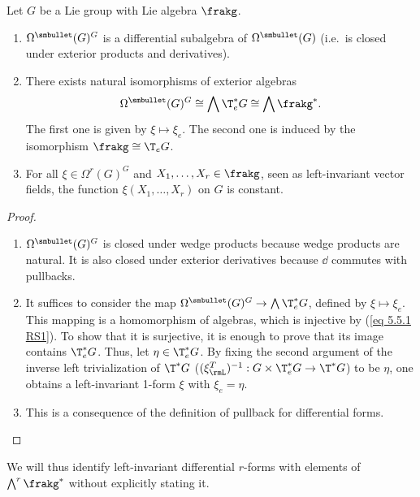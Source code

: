 \begin{prop}[{{\cite[Prop.~5.5.2]{RS1}}}]\label{prop 5.5.2 RS1}
    Let $G$ be a Lie group with Lie algebra $\frakg$.
    \begin{enumerate}
        \item $\Omega^{\smbullet }(G)^G$ is a differential subalgebra of $\Omega^{\smbullet }(G)$ (i.e.~is closed under exterior products and derivatives).
        \item There exists natural isomorphisms of exterior algebras
        \[\Omega^{\smbullet }(G)^G\cong \bigwedge \T^\ast_e G\cong \bigwedge \frakg^\ast.\]
        The first one is given by $\xi\mapsto \xi_e$. The second one is induced by the isomorphism $\frakg\cong \T_eG$.
        \item For all $\xi\in\Omega^r(G)^G$ and $X_1,\ldots,X_r\in\frakg$, seen as left-invariant vector fields, the function $\xi(X_1,\ldots,X_r)$ on $G$ is constant.
    \end{enumerate}
\end{prop}
\begin{proof}
    \begin{enumerate}
        \item $\Omega^{\smbullet }(G)^G$ is closed under wedge products because wedge products are natural. It is also closed under exterior derivatives because $\dd$ commutes with pullbacks.
        \item It suffices to consider the map $\Omega^{\smbullet }(G)^G\to\bigwedge \T^\ast_e G$, defined by $\xi\mapsto\xi_e$. This mapping is a homomorphism of algebras, which is injective by (\ref{eq 5.5.1 RS1}). To show that it is surjective, it is enough to prove that its image contains $\T^\ast_e G$. Thus, let $\eta\in \T^\ast_e G$. By fixing the second argument of the inverse left trivialization of $\T^\ast G$ ($(\xi_\rmL^T)^{-1}:G\times \T_e^\ast G\to \T^\ast G$) to be $\eta$, one obtains a left-invariant 1-form $\xi$ with $\xi_e=\eta$.
        \item  This is a consequence of the definition of pullback for differential forms.
    \end{enumerate}
\end{proof}

We will thus identify left-invariant differential $r$-forms with elements of $\bigwedge^r\frakg^\ast$ without explicitly stating it. 



